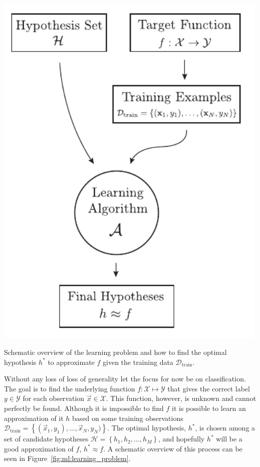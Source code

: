 \begin{marginfigure}
  \includegraphics[width=0.99\textwidth, trim=5 5 10 5, clip]{figures/learning_problem/learning_problem.pdf}
  \caption[Overview of the learning problem.]
    {Schematic overview of the learning problem and how to find the optimal hypothesis $h^*$ to approximate $f$ given the training data $\mathcal{D}_\mathrm{train}$.
    }
  \label{fig:ml:learning_problem}
\end{marginfigure}

Without any loss of loss of generality let the focus for now be on classification. The goal is to find the underlying  function $f: \mathcal{X} \mapsto \mathcal{Y}$ that gives the correct label $y\in\mathcal{Y}$ for each observation $\vec{x}\in\mathcal{X}$. This function, however, is unknown and cannot perfectly be found. Although it is impossible to find $f$ it is possible to learn an approximation of it $h$ based on some training observations $\mathcal{D}_\mathrm{train} = \left \{(\vec{x}_1, y_1), \dots, \vec{x}_N, y_N) \right\}$. The optimal hypothesis, $h^*$, is chosen among a set of candidate hypotheses $\mathcal{H} = \left\{h_1, h_2, \ldots, h_M  \right\}$, and hopefully $h^*$ will be a good approximation of $f$, $h^* \approx f$. A schematic overview of this process can be seen in Figure~\ref{fig:ml:learning_problem}. 

